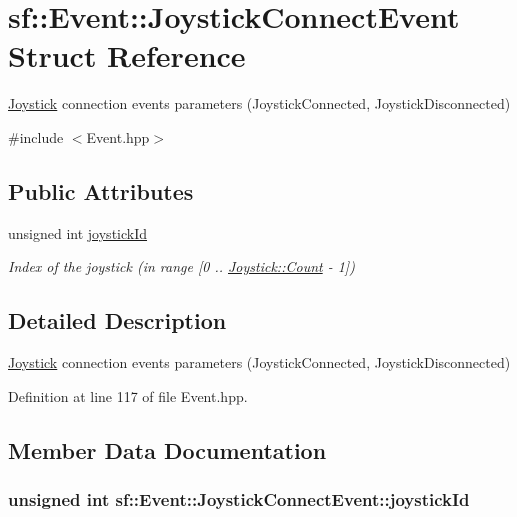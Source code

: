 \hypertarget{structsf_1_1_event_1_1_joystick_connect_event}{\section{sf\-:\-:Event\-:\-:Joystick\-Connect\-Event Struct Reference}
\label{structsf_1_1_event_1_1_joystick_connect_event}
}


\hyperlink{classsf_1_1_joystick}{Joystick} connection events parameters (Joystick\-Connected, Joystick\-Disconnected)  




{\ttfamily \#include $<$Event.\-hpp$>$}

\subsection*{Public Attributes}
\begin{DoxyCompactItemize}
\item 
unsigned int \hyperlink{structsf_1_1_event_1_1_joystick_connect_event_a08e58e8559d3e4fe4654855fec79194b}{joystick\-Id}
\begin{DoxyCompactList}\small\item\em Index of the joystick (in range \mbox{[}0 .. \hyperlink{classsf_1_1_joystick_ac4ca4ee36e2cf04ecf931316e4463ca6a6e0a2a95bc1da277610c04d80f52715e}{Joystick\-::\-Count} -\/ 1\mbox{]}) \end{DoxyCompactList}\end{DoxyCompactItemize}


\subsection{Detailed Description}
\hyperlink{classsf_1_1_joystick}{Joystick} connection events parameters (Joystick\-Connected, Joystick\-Disconnected) 

Definition at line 117 of file Event.\-hpp.



\subsection{Member Data Documentation}
\hypertarget{structsf_1_1_event_1_1_joystick_connect_event_a08e58e8559d3e4fe4654855fec79194b}{
\subsubsection[{joystick\-Id}]{\setlength{\rightskip}{0pt plus 5cm}unsigned int sf\-::\-Event\-::\-Joystick\-Connect\-Event\-::joystick\-Id}}\label{structsf_1_1_event_1_1_joystick_connect_event_a08e58e8559d3e4fe4654855fec79194b}


